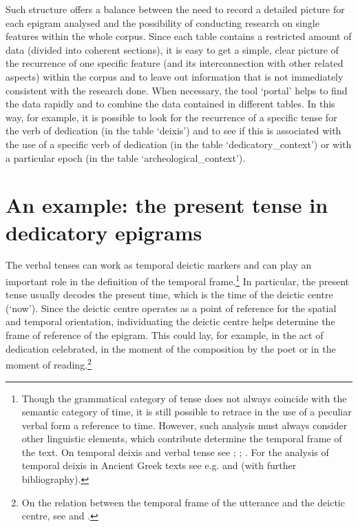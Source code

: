 \documentclass[amsthm,ebook]{saparticle}
\begin{document}
Such structure offers a balance between the need to record a detailed picture for each epigram analysed and the
possibility of conducting research on single features within the whole corpus. Since each table contains a restricted
amount of data (divided into coherent sections), it is easy to get a simple, clear picture of the recurrence of one
specific feature (and its interconnection with other related aspects) within the corpus and to leave out information
that is not immediately consistent with the research done. When necessary, the tool `portal' helps to find the data
rapidly and to combine the data contained in different tables. In this way, for example, it is possible to look for the
recurrence of a specific tense for the verb of dedication (in the table `deixis') and to see if this is associated with
the use of a specific verb of dedication (in the table `dedicatory\_context') or with a particular epoch (in the table
`archeological\_context').




\section{An example: the present tense in dedicatory epigrams}


\noindent The verbal tenses can work as temporal deictic markers and can play an important role in the definition of the temporal
frame.\footnote{ Though the grammatical category of tense does not always coincide with the semantic category of time,
it is still possible to retrace in the use of a peculiar verbal form a reference to time. However, such analysis must
always consider other linguistic elements, which contribute determine the temporal frame of the text. On temporal
deixis and verbal tense see \citet[677-690]{lyons_semantics_1977}; \citet[73-79]{levinson_pragmatics_1983}; \citet[14-26 and 120-130]{klein_time_1994}. For the
analysis of temporal deixis in Ancient Greek texts see e.g. \citep{dalessio_past_2004} and \citet[8f.]{edmunds_deixis_2008} (with further
bibliography).} In particular, the present tense usually decodes the present time, which is the time of the deictic
centre (`now'). Since the deictic centre operates as a point of reference for the spatial and temporal orientation,
individuating the deictic centre helps determine the frame of reference of the epigram. This could lay, for example, in
the act of dedication celebrated, in the moment of the composition by the poet or in the moment of reading.\footnote{
On the relation between the temporal frame of the utterance and the deictic centre, see \citet[79f.]{levinson_pragmatics_1983} and
\citep{dalessio_past_2004}.} \ 
\end{document}
